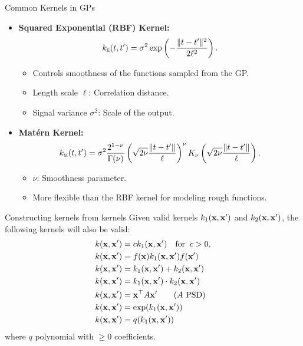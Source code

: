 \documentclass[11pt,handout,aspectratio=169]{beamer}
\begin{document}
\begin{frame}{Common Kernels in GPs}
\begin{itemize}
    \item \textbf{Squared Exponential (RBF) Kernel:}
    \[
    k_{\textsc{e}}(t, t') = \sigma^2 \exp\left(-\frac{\|t - t'\|^2}{2\ell^2}\right).
    \]
    \begin{itemize}
        \item Controls smoothness of the functions sampled from the GP.
        \item Length scale \( \ell \): Correlation distance.
        \item Signal variance \( \sigma^2 \): Scale of the output.
    \end{itemize}
    \item \textbf{Mat\'{e}rn Kernel:}
    \[
    k_{\textsc{m}}(t, t') = \sigma^2 \frac{2^{1-\nu}}{\Gamma(\nu)} \left(\sqrt{2\nu} \frac{\|t - t'\|}{\ell}\right)^\nu K_\nu\left(\sqrt{2\nu} \frac{\|t - t'\|}{\ell}\right).
    \]
    \begin{itemize}
        \item \( \nu \): Smoothness parameter.
        \item More flexible than the RBF kernel for modeling rough functions.
    \end{itemize}
\end{itemize}
\end{frame}


\begin{frame}{Constructing kernels from kernels}
Given valid kernels $k_1(\mathbf{x},\mathbf{x}')$ and $k_2(\mathbf{x},\mathbf{x}')$, the following kernels will also be valid:
\begin{align*}
	k(\mathbf{x},\mathbf{x}')&=ck_1(\mathbf{x},\mathbf{x}')\quad\mbox{for}\;\; c>0,\\
	k(\mathbf{x},\mathbf{x}')&=f(\mathbf{x})k_1(\mathbf{x},\mathbf{x}')f(\mathbf{x}')\\
	k(\mathbf{x},\mathbf{x}')&=k_1(\mathbf{x},\mathbf{x}')+k_2(\mathbf{x},\mathbf{x}')\\
	k(\mathbf{x},\mathbf{x}')&=k_1(\mathbf{x},\mathbf{x}')\cdot k_2(\mathbf{x},\mathbf{x}')\\
	k(\mathbf{x},\mathbf{x}')&=\mathbf{x}^\top A\mathbf{x}'\qquad (A\mbox{ PSD})\\
	k(\mathbf{x},\mathbf{x}')&=\exp(k_1(\mathbf{x},\mathbf{x}'))\\
	k(\mathbf{x},\mathbf{x}')&=q(k_1(\mathbf{x},\mathbf{x}'))
\end{align*}
where $q$ polynomial with $\geq 0$ coefficients. 
\end{frame}
\end{document}
